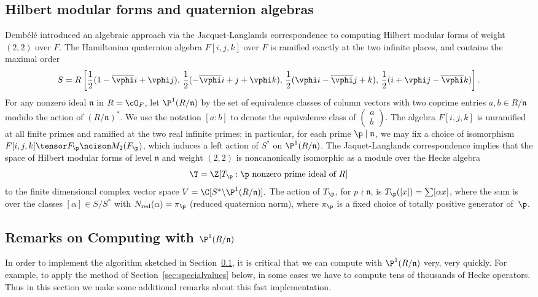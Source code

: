 \documentclass{amsart}
\newcommand{\n}{\mathfrak{n}}
\newcommand{\dembele}{Demb\'el{\'e}\xspace}
\begin{document}
\subsection{Hilbert modular forms and quaternion 
algebras}\label{sec:dembele}
\dembele \cite{dembele:hilbert5} introduced an algebraic approach via
the Jacquet-Langlands correspondence to computing Hilbert modular
forms of weight $(2,2)$ over $F$.  The Hamiltonian quaternion algebra
$F[i,j,k]$ over $F$ is ramified exactly at the two infinite places,
and contains the maximal order
$$
 S = R\left[\frac{1}{2}(1-\overline{\vphi} i + \vphi j),\,
       \frac{1}{2}(-\overline{\vphi} i + j + \vphi k),\,
       \frac{1}{2}(\vphi i - \overline{\vphi} j + k), \,
       \frac{1}{2}(i + \vphi j - \overline{\vphi} k)\right].
$$
For any nonzero ideal $\n$ in $R=\cO_F$,
let $\P^1(R/\n)$ by the set of equivalence classes of
 column vectors with two coprime entries $a,b \in R/\n$ modulo the
 action of $(R/\n)^*$.  We use the notation $[a:b]$
to denote the equivalence class of 
$\left(\begin{smallmatrix}a\\b\end{smallmatrix}\right)$.
The algebra $F[i,j,k]$ is unramified at all finite primes and ramified
at the two real infinite primes; in
particular, for each prime $\p\mid \n$, we may fix a choice of isomorphism
$F[i,j,k]\tensor F_{\p} \ncisom M_2(F_{\p})$, which induces a left
action of $S^*$ on $\P^1(R/\n)$. The Jaquet-Langlands correspondence implies that
the space of Hilbert modular forms of level $\n$ and weight $(2,2)$ is
noncanonically isomorphic as a module over the Hecke algebra
$$\T=\Z[T_\p :  \p \text{ nonzero prime ideal of }R]$$ 
to the finite dimensional complex vector space $ V = \C[S^* \backslash
\P^1(R/\n)].  $ The action of $T_{\p}$, for $p\nmid \n$, is
$T_{\p}([x]) = \sum [\alpha x]$, where the sum is over the classes
$[\alpha]\in S/S^*$ with $N_{\text{red}}(\alpha)=\pi_{\p}$ (reduced quaternion norm),
where $\pi_{\p}$ is a fixed choice of totally positive generator of~$\p$.

\subsection{Remarks on Computing with $\P^1(R/\n)$}\label{sec:p1rn}

In order to implement the algorithm sketched in
Section~\ref{sec:dembele}, it is critical that we can compute with
$\P^1(R/\n)$ very, very quickly.  For example, to apply the method of
Section~\ref{sec:specialvalues} below, in some cases we have to
compute tens of thousands of Hecke operators.  Thus in this section we
make some additional remarks about this fast
implementation.
\end{document}
